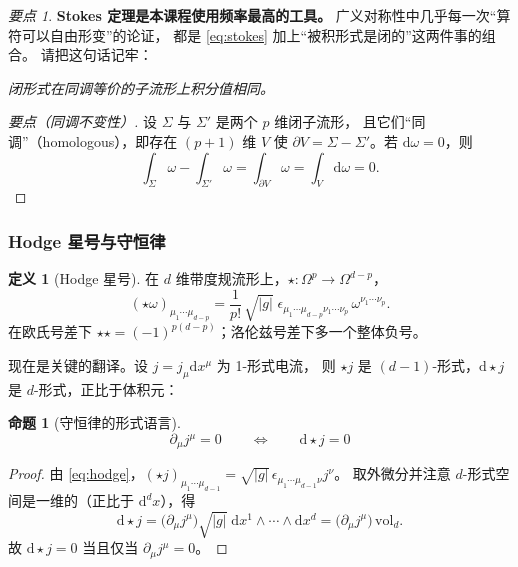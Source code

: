 \documentclass[UTF8,a4paper,11pt]{ctexart}
\theoremstyle{plain}
\newtheorem{proposition}{命题}[section]
\theoremstyle{definition}
\newtheorem{definition}{定义}[section]
\theoremstyle{remark}
\newtheorem{keypoint}{要点}[section]
\newcommand{\ext}{\mathrm{d}}          %
\newcommand{\hs}{\star}                %
\newcommand{\Vol}{\mathrm{vol}}
\newcommand{\Ssurf}{\Sigma}
\newcommand{\en}[1]{\textsf{#1}}       %
\begin{document}
\begin{keypoint}
\label{kp:stokes}
\textbf{Stokes 定理是本课程使用频率最高的工具。}
广义对称性中几乎每一次“算符可以自由形变”的论证，
都是 \eqref{eq:stokes} 加上“被积形式是闭的”这两件事的组合。
请把这句话记牢：
\begin{center}
\emph{闭形式在同调等价的子流形上积分值相同。}
\end{center}
\end{keypoint}

\begin{proof}[要点（同调不变性）]
设 $\Ssurf$ 与 $\Ssurf'$ 是两个 $p$ 维闭子流形，
且它们“同调”（\en{homologous}），即存在 $(p+1)$ 维 $V$ 使
$\partial V=\Ssurf-\Ssurf'$。若 $\ext\omega=0$，则
\begin{equation}
  \int_\Ssurf\omega-\int_{\Ssurf'}\omega
  =\int_{\partial V}\omega
  =\int_V \ext\omega=0 .
  \label{eq:homologyinv}
\end{equation}
\end{proof}

\subsubsection{Hodge 星号与守恒律}

\begin{definition}[Hodge 星号]
在 $d$ 维带度规流形上，$\hs:\Omega^p\to\Omega^{d-p}$，
\begin{equation}
  (\hs\omega)_{\mu_1\cdots\mu_{d-p}}
  =\frac{1}{p!}\,\sqrt{|g|}\;
  \epsilon_{\mu_1\cdots\mu_{d-p}\nu_1\cdots\nu_p}\,
  \omega^{\nu_1\cdots\nu_p} .
  \label{eq:hodge}
\end{equation}
在欧氏号差下 $\hs\hs=(-1)^{p(d-p)}$；洛伦兹号差下多一个整体负号。
\end{definition}

现在是关键的翻译。设 $j=j_\mu \ext x^\mu$ 为 1-形式电流，
则 $\hs j$ 是 $(d-1)$-形式，$\ext\hs j$ 是 $d$-形式，正比于体积元：

\begin{proposition}[守恒律的形式语言]
\begin{equation}
  \boxed{\ \partial_\mu j^\mu=0
  \qquad\Longleftrightarrow\qquad
  \ext\hs j=0\ }
  \label{eq:conservation}
\end{equation}
\end{proposition}

\begin{proof}
由 \eqref{eq:hodge}，$(\hs j)_{\mu_1\cdots\mu_{d-1}}
=\sqrt{|g|}\,\epsilon_{\mu_1\cdots\mu_{d-1}\nu}j^\nu$。
取外微分并注意 $d$-形式空间是一维的（正比于
$\ext^dx$），得
\begin{equation}
  \ext\hs j=\big(\partial_\mu j^\mu\big)\sqrt{|g|}\;
  \ext x^1\wedge\cdots\wedge \ext x^d
  =\big(\partial_\mu j^\mu\big)\,\Vol_d .
\end{equation}
故 $\ext\hs j=0$ 当且仅当 $\partial_\mu j^\mu=0$。
\end{proof}
\end{document}
